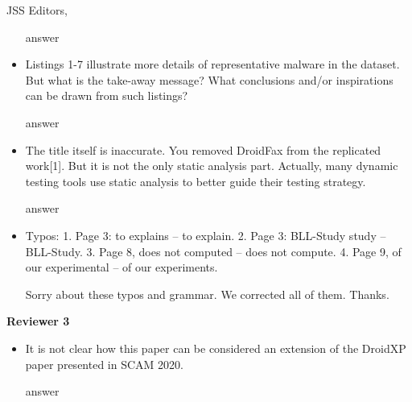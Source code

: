 \documentclass{letter}
\begin{document}
\begin{letter}{JSS Editors,}
\begin{itemize}
\vspace{0.2cm}

{\color{blue}{\bf Answer:} answer}

\vspace{0.2cm}

\item Listings 1-7 illustrate more details of representative malware in the dataset. But what is the take-away message? What 
conclusions and/or inspirations can be drawn from such listings?


\vspace{0.2cm}

{\color{blue}{\bf Answer:} answer}

\vspace{0.2cm}

\item The title itself is inaccurate. You removed DroidFax from the replicated work[1]. But it is not the only static analysis part. 
Actually, many dynamic testing tools use static analysis to better guide their testing strategy.


\vspace{0.2cm}

{\color{blue}{\bf Answer:} answer}

\vspace{0.2cm}

\item Typos:
1. Page 3: to explains -- to explain.
2. Page 3: BLL-Study study -- BLL-Study.
3. Page 8, does not computed -- does not compute.
4. Page 9, of our experimental -- of our experiments.


\vspace{0.2cm}

{\color{blue}{\bf Answer:} Sorry about these typos and grammar. We corrected all of them. Thanks.}

\end{itemize}

{\bf Reviewer 3}

\begin{itemize}

\item It is not clear how this paper can be considered an extension of the DroidXP paper presented in SCAM 2020.


\vspace{0.2cm}

{\color{blue}{\bf Answer:} answer}

\vspace{0.2cm}


\end{itemize}
\end{letter}
\end{document}
